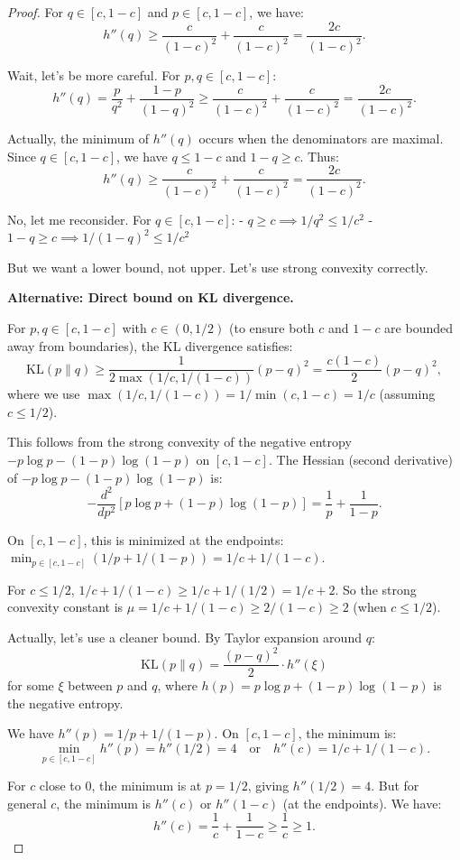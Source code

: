 \documentclass[12pt]{article}
\begin{document}
\begin{proof}
For $q \in [c, 1-c]$ and $p \in [c, 1-c]$, we have:
\[
h''(q) \ge \frac{c}{(1-c)^2} + \frac{c}{(1-c)^2} = \frac{2c}{(1-c)^2}.
\]

Wait, let's be more careful. For $p, q \in [c, 1-c]$:
\[
h''(q) = \frac{p}{q^2} + \frac{1-p}{(1-q)^2} \ge \frac{c}{(1-c)^2} + \frac{c}{(1-c)^2} = \frac{2c}{(1-c)^2}.
\]

Actually, the minimum of $h''(q)$ occurs when the denominators are maximal. Since $q \in [c, 1-c]$, we have $q \le 1-c$ and $1-q \ge c$. Thus:
\[
h''(q) \ge \frac{c}{(1-c)^2} + \frac{c}{(1-c)^2} = \frac{2c}{(1-c)^2}.
\]

No, let me reconsider. For $q \in [c, 1-c]$:
- $q \ge c \implies 1/q^2 \le 1/c^2$
- $1-q \ge c \implies 1/(1-q)^2 \le 1/c^2$

But we want a lower bound, not upper. Let's use strong convexity correctly.

\textbf{Alternative: Direct bound on KL divergence.}

For $p, q \in [c, 1-c]$ with $c \in (0, 1/2)$ (to ensure both $c$ and $1-c$ are bounded away from boundaries), the KL divergence satisfies:
\[
\text{KL}(p \| q) \ge \frac{1}{2 \max(1/c, 1/(1-c))} (p - q)^2 = \frac{c(1-c)}{2} (p - q)^2,
\]
where we use $\max(1/c, 1/(1-c)) = 1/\min(c, 1-c) = 1/c$ (assuming $c \le 1/2$).

This follows from the strong convexity of the negative entropy $-p \log p - (1-p) \log(1-p)$ on $[c, 1-c]$. The Hessian (second derivative) of $-p \log p - (1-p) \log(1-p)$ is:
\[
-\frac{d^2}{dp^2}[p \log p + (1-p) \log(1-p)] = \frac{1}{p} + \frac{1}{1-p}.
\]

On $[c, 1-c]$, this is minimized at the endpoints: $\min_{p \in [c,1-c]} (1/p + 1/(1-p)) = 1/c + 1/(1-c)$.

For $c \le 1/2$, $1/c + 1/(1-c) \ge 1/c + 1/(1/2) = 1/c + 2$. So the strong convexity constant is $\mu = 1/c + 1/(1-c) \ge 2/(1-c) \ge 2$ (when $c \le 1/2$).

Actually, let's use a cleaner bound. By Taylor expansion around $q$:
\[
\text{KL}(p \| q) = \frac{(p-q)^2}{2} \cdot h''(\xi)
\]
for some $\xi$ between $p$ and $q$, where $h(p) = p \log p + (1-p) \log(1-p)$ is the negative entropy.

We have $h''(p) = 1/p + 1/(1-p)$. On $[c, 1-c]$, the minimum is:
\[
\min_{p \in [c,1-c]} h''(p) = h''(1/2) = 4 \quad \text{or} \quad h''(c) = 1/c + 1/(1-c).
\]

For $c$ close to 0, the minimum is at $p = 1/2$, giving $h''(1/2) = 4$. But for general $c$, the minimum is $h''(c)$ or $h''(1-c)$ (at the endpoints). We have:
\[
h''(c) = \frac{1}{c} + \frac{1}{1-c} \ge \frac{1}{c} \ge 1.
\]


\end{proof}
\end{document}
